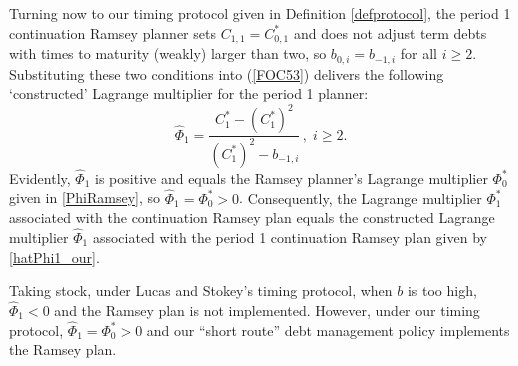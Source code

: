 \documentclass[12pt]{article}
\newcommand{\WJ}[1]{{\textcolor{red}{#1}}}
\begin{document}
	Turning now to  our  timing protocol given in Definition \ref{defprotocol}, the period 1 continuation Ramsey planner sets  $C_{1, 1}=C_{0,1}^*$ and  does not adjust term debts with times to maturity (weakly) larger than two, so $b_{0,i}=b_{-1, i}$ for all $i\geq 2$. 
	Substituting these two conditions into (\ref{FOC53}) %
	delivers the following `constructed' Lagrange multiplier for the period 1 planner: %
	\begin{equation} \label{hatPhi1_our}
		\widehat{\Phi}_1 = \frac{C_1^*-(C_1^*)^2}{(C_1^*)^2-b_{-1, i}}\,, \; i\geq 2. 
	\end{equation}
Evidently,   $\widehat{\Phi}_1$ is positive and equals the Ramsey planner's  Lagrange multiplier $\Phi_0^*$ given in \eqref{PhiRamsey}, so $\widehat{\Phi}_1=\Phi_0^*>0$. {Consequently,  the  Lagrange multiplier ${\Phi}_1^\ast$  associated with the continuation Ramsey plan equals the constructed Lagrange multiplier 
	$\widehat\Phi_1$ associated with the  period 1 continuation Ramsey plan given by \eqref{hatPhi1_our}.}

{Taking stock,   under Lucas and Stokey's timing protocol,     when $b$ is too high, {$\widehat{\Phi}_1<0$} and  the Ramsey plan is not implemented. 
However, under our timing protocol,   $\widehat{\Phi}_1=\Phi_0^*>0$ and our ``short route'' debt management policy  implements the Ramsey plan. 
} %
\end{document}
